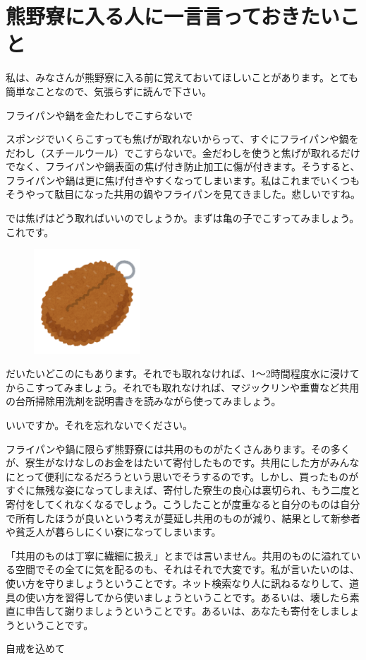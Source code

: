 \section{熊野寮に入る人に一言言っておきたいこと}
\label{sec:kanadawasi}



私は、みなさんが熊野寮に入る前に覚えておいてほしいことがあります。とても簡単なことなので、気張らずに読んで下さい。

\centerline{\Large フライパンや鍋を金たわしでこすらないで}

スポンジでいくらこすっても焦げが取れないからって、すぐにフライパンや鍋をだわし（スチールウール）でこすらないで。金だわしを使うと焦げが取れるだけでなく、フライパンや鍋表面の焦げ付き防止加工に傷が付きます。そうすると、フライパンや鍋は更に焦げ付きやすくなってしまいます。私はこれまでいくつもそうやって駄目になった共用の鍋やフライパンを見てきました。悲しいですね。

では焦げはどう取ればいいのでしょうか。まずは亀の子でこすってみましょう。これです。
\begin{figure}[H]
  \centering
  \includegraphics[width=4cm]{gazo/goods_tawashi.png}
\end{figure}
だいたいどこのにもあります。それでも取れなければ、1〜2時間程度水に浸けてからこすってみましょう。それでも取れなければ、マジックリンや重曹など共用の台所掃除用洗剤を説明書きを読みながら使ってみましょう。

いいですか。それを忘れないでください。

フライパンや鍋に限らず熊野寮には共用のものがたくさんあります。その多くが、寮生がなけなしのお金をはたいて寄付したものです。共用にした方がみんなにとって便利になるだろうという思いでそうするのです。しかし、買ったものがすぐに無残な姿になってしまえば、寄付した寮生の良心は裏切られ、もう二度と寄付をしてくれなくなるでしょう。こうしたことが度重なると自分のものは自分で所有したほうが良いという考えが蔓延し共用のものが減り、結果として新参者や貧乏人が暮らしにくい寮になってしまいます。

「共用のものは丁寧に繊細に扱え」とまでは言いません。共用のものに溢れている空間でその全てに気を配るのも、それはそれで大変です。私が言いたいのは、使い方を守りましょうということです。ネット検索なり人に訊ねるなりして、道具の使い方を習得してから使いましょうということです。あるいは、壊したら素直に申告して謝りましょうということです。あるいは、あなたも寄付をしましょうということです。

自戒を込めて